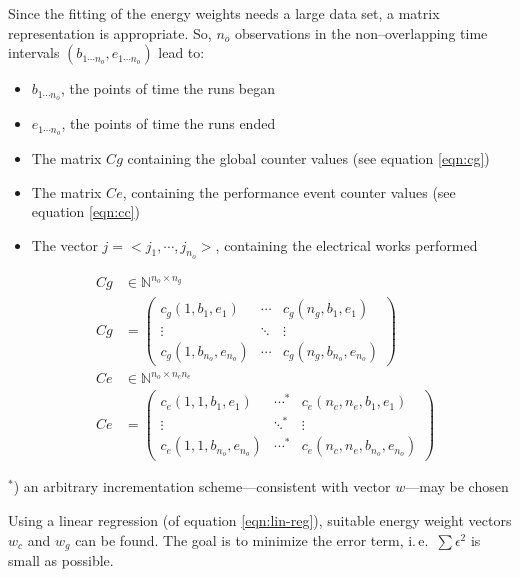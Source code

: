 Since the fitting of the energy weights needs a large data set, a matrix
representation is appropriate. So, $n_o$ observations in the non--overlapping
time intervals $(b_{1 \cdots n_o}, e_{1 \cdots n_o})$ lead to:

\begin{itemize}

\item $b_{1 \cdots n_o}$, the points of time the runs began

\item $e_{1 \cdots n_o}$, the points of time the runs ended

\item The matrix $Cg$ containing the global counter values (see equation
\ref{eqn:cg})

\item The matrix $Ce$, containing the performance event counter values (see
equation \ref{eqn:cc})

\item The vector $j = <j_1, \cdots, j_{n_o}>$, containing the electrical works
performed

\end{itemize}

\begin{eqnarray}
\label{eqn:cg}
& Cg & \in \mathbb{N}^{n_o \times n_g} \\
& Cg & =
\begin{pmatrix}
c_g(1, b_1, e_1)         & \cdots & c_g(n_g, b_1, e_1)        \\
\vdots                   & \ddots & \vdots                    \\
c_g(1, b_{n_o}, e_{n_o}) & \cdots & c_g(n_g, b_{n_o}, e_{n_o})
\end{pmatrix} \\
\label{eqn:cc}
& Ce & \in \mathbb{N}^{n_o \times n_cn_e } \\
& Ce & =
\begin{pmatrix}
c_e(1, 1, b_1, e_1)         & \cdots^* & c_e(n_c, n_e, b_1, e_1)         \\
\vdots                      & \ddots^* & \vdots                          \\
c_e(1, 1, b_{n_o}, e_{n_o}) & \cdots^* & c_e(n_c, n_e, b_{n_o}, e_{n_o})
\end{pmatrix}
\end{eqnarray}

$ ^*$) an arbitrary incrementation scheme---consistent with vector $w$---may be
chosen

Using a linear regression (of equation \ref{eqn:lin-reg}), suitable energy
weight vectors $w_c$ and $w_g$ can be found. The goal is to minimize the error
term, i.\,e.\ $\sum\epsilon^2$ is small as possible.


